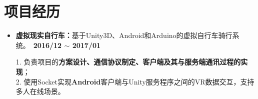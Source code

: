 \documentclass[letterpaper, UTF8, 11pt]{article}
\begin{document}
	\section*{\textbf{项目经历}}\vspace{-0.12in}
	\begin{itemize}	
		\item \textbf{虚拟现实自行车：}{基于Unity3D、Android和Arduino的虚拟自行车骑行系统。}~\textbf{2016/12 $\sim$ 2017/01}
		
		1. 负责项目的\textbf{方案设计、通信协议制定、客户端及其与服务端通讯过程的实现}；\\
		2. 使用Socket实现\textbf{Android}客户端与Unity服务程序之间的VR数据交互，支持多人在线场景。
		\vspace{0.03in}
		
		

\end{itemize}
\end{document}
